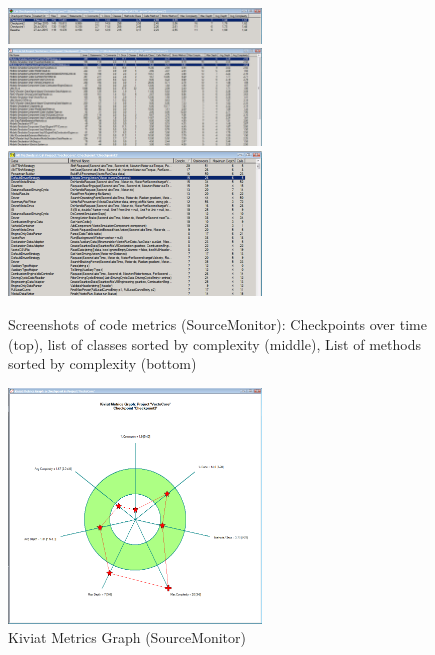 \begin{figure}
	\centering
	\includegraphics[width=0.6\textwidth]{img/Vecto3_0_1-Checkpoints.png}\\[1cm]

	\includegraphics[width=0.6\textwidth]{img/Vecto3_0_1-ClassComplexity.png}\\[1cm]

	\includegraphics[width=0.6\textwidth]{img/Vecto3_0_1-MethodComplexity.png}

	\caption{Screenshots of code metrics (SourceMonitor): Checkpoints over time (top), list of classes sorted by complexity (middle), List of methods sorted by complexity (bottom)}
	\label{fig:Vecto301_Komplexity}
\end{figure}

\begin{figure}
	\centering

	\includegraphics[width=0.6\textwidth]{img/Vecto3_0_1-Kiviat.png}
	\caption{Kiviat Metrics Graph (SourceMonitor)}
	\label{fig:Vecto301_Kiviat}
\end{figure}


